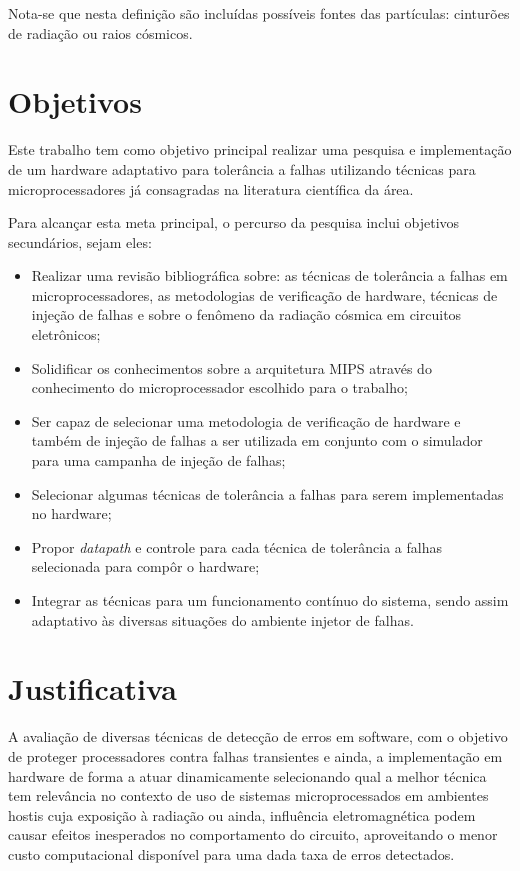 Nota-se que nesta definição são incluídas possíveis fontes das partículas: cinturões de radiação ou raios cósmicos.

\section{Objetivos}
Este trabalho tem como objetivo principal realizar uma pesquisa e implementação de um hardware adaptativo para tolerância a falhas utilizando técnicas para microprocessadores já consagradas na literatura científica da área.

Para alcançar esta meta principal, o percurso da pesquisa inclui objetivos secundários, sejam eles: 

\begin{itemize}

\item Realizar uma revisão bibliográfica sobre: as técnicas de tolerância a falhas em microprocessadores, as metodologias de verificação de hardware, técnicas de injeção de falhas e sobre o fenômeno da radiação cósmica em circuitos eletrônicos;
\item Solidificar os conhecimentos sobre a arquitetura MIPS através do conhecimento do microprocessador escolhido para o trabalho;
\item Ser capaz de selecionar uma metodologia de verificação de hardware e também de injeção de falhas a ser utilizada em conjunto com o simulador para uma campanha de injeção de falhas;
\item Selecionar algumas técnicas de tolerância a falhas para serem implementadas no hardware;
\item Propor \textit{datapath} e controle para cada técnica de tolerância a falhas selecionada para compôr o hardware;
\item Integrar as técnicas para um funcionamento contínuo do sistema, sendo assim adaptativo às diversas situações do ambiente injetor de falhas.

\end{itemize}

\section{Justificativa}
A avaliação de diversas técnicas de detecção de erros em software, com o objetivo de proteger processadores contra falhas transientes e ainda, a implementação em hardware de forma a atuar dinamicamente selecionando qual a melhor técnica tem relevância no contexto de uso de sistemas microprocessados em ambientes hostis cuja exposição à radiação ou ainda, influência eletromagnética podem causar efeitos inesperados no comportamento do circuito, aproveitando o menor custo computacional disponível para uma dada taxa de erros detectados.

